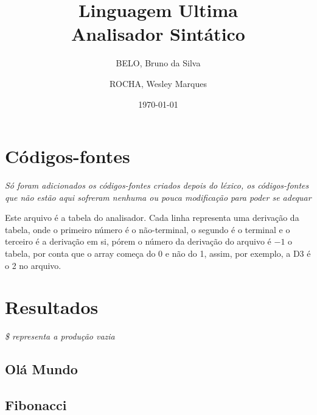\documentclass[12pt, a4paper]{memoir}
\title{Linguagem Ultima
  \\ Analisador Sintático}
\author{BELO, Bruno da Silva \and ROCHA, Wesley Marques}
\date{\today}
\begin{document}
\frontmatter
\begin{titlingpage}
  \maketitle
\end{titlingpage}

\tableofcontents

\mainmatter

\section{Códigos-fontes}
\label{sec:codigo_fonte}

\emph{Só foram adicionados os códigos-fontes criados depois do léxico, os códigos-fontes que não estão aqui sofreram nenhuma ou pouca modificação para poder se adequar}






Este arquivo é a tabela do analisador. Cada linha representa uma derivação da tabela, onde o primeiro número é o não-terminal, o segundo é o terminal e o terceiro é a derivação em si, pórem o número da derivação do arquivo é $-1$ o tabela, por conta que o array começa do 0 e não do 1, assim, por exemplo, a D3 é o 2 no arquivo.


\section{Resultados}
\emph{\$ representa a produção vazia}
\subsection{Olá Mundo}
\label{subsec:hello}


\subsection{Fibonacci}
\label{subsec:fibonacci}


\end{document}
